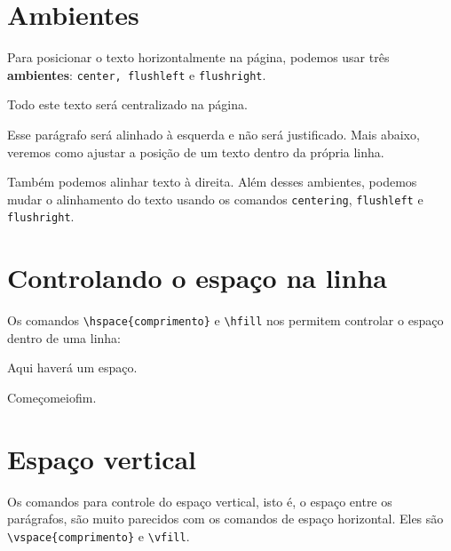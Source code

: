 \documentclass[a4paper,oneside]{article}
\begin{document}
\frenchspacing

\section{Ambientes}

Para posicionar o texto horizontalmente na página, podemos usar três
\textbf{ambientes}: \texttt{center, flushleft} e \texttt{flushright}.

\begin{center}
  Todo este texto será centralizado na página.
\end{center}

\begin{flushleft}
  Esse parágrafo será alinhado à esquerda e não será justificado. Mais abaixo,
  veremos como ajustar a posição de um texto dentro da própria linha.
\end{flushleft}

\begin{flushright}
  Também podemos alinhar texto à direita. Além desses ambientes, podemos mudar
  o alinhamento do texto usando os comandos \verb+centering+, \verb+flushleft+
  e \verb+flushright+.
\end{flushright}

\section{Controlando o espaço na linha}

Os comandos \verb+\hspace{comprimento}+ e \verb+\hfill+ nos permitem controlar
o espaço dentro de uma linha:

Aqui haverá\hspace{1.5cm} um espaço.

Começo\hfill meio\hfill fim.

\section{Espaço vertical}

Os comandos para controle do espaço vertical, isto é, o espaço entre os
parágrafos, são muito parecidos com os comandos de espaço horizontal. Eles são
\verb+\vspace{comprimento}+ e \verb+\vfill+.
\end{document}
